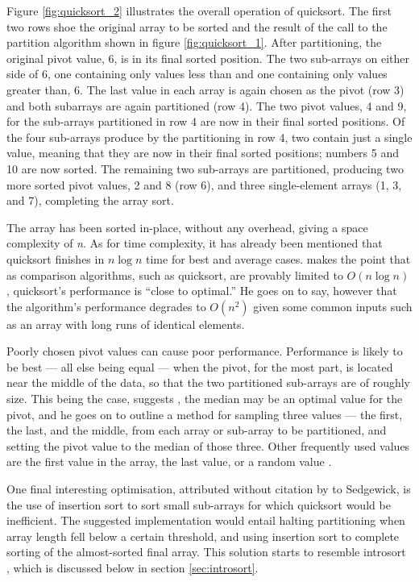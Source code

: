 \documentclass[12pt, a4paper]{article}
\begin{document}
Figure \ref{fig:quicksort_2} illustrates the overall operation of quicksort. The first two rows shoe the original array to be sorted and the result of the call to the partition algorithm shown in figure \ref{fig:quicksort_1}. After partitioning, the original pivot value, 6, is in its final sorted position. The two sub-arrays on either side of 6, one containing only values less than and one containing only values greater than, 6. The last value in each array is again chosen as the pivot (row 3) and both subarrays are again partitioned (row 4). The two pivot values, 4 and 9, for the sub-arrays partitioned in row 4 are now in their final sorted positions. Of the four sub-arrays produce by the partitioning in row 4, two contain just a single value, meaning that they are now in their final sorted positions; numbers 5 and 10 are now sorted. The remaining two sub-arrays are partitioned, producing two more sorted pivot values, 2 and 8 (row 6), and three single-element arrays (1, 3, and 7), completing the array sort. 

The array has been sorted in-place, without any overhead, giving a space complexity of \emph{n}. As for time complexity, it has already been mentioned that quicksort finishes in $n\log n$ time for best and average cases. \textcite[119]{bentley:pearls} makes the point that as comparison algorithms, such as quicksort, are provably limited to $O(n\log n)$, quicksort's performance is ``close to optimal.''  He goes on to say, however that the algorithm's performance degrades to $O(n^{2})$ given some common inputs such as an array with long runs of identical elements.

Poorly chosen pivot values can cause poor performance. Performance is likely to be best — all else being equal — when the pivot, for the most part, is located near the middle of the data, so that the two partitioned sub-arrays are of roughly size. This being the case, suggests \textcite[851]{Sedgewick-1978}, the median may be an optimal value for the pivot, and he goes on to outline a method for sampling three values — the first, the last, and the middle, from each array or sub-array to be partitioned, and setting the pivot value to the median of those three. Other frequently used values are the first value in the array, the last value, or a random value \autocite*[73]{heineman2016algorithms}.

One final interesting optimisation, attributed without citation by \textcite[121]{bentley:pearls} to Sedgewick, is the use of insertion sort to sort small sub-arrays for which quicksort would be inefficient. The suggested implementation would entail halting partitioning when array length fell below a certain threshold, and using insertion sort to complete sorting of the almost-sorted final array. This solution starts to resemble introsort \autocite{musser1997}, which is discussed below in section \ref{sec:introsort}.
\end{document}
